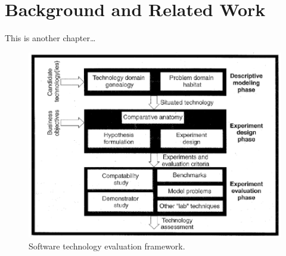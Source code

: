 \chapter{Background and Related Work}
\label{chap:background}
This is another chapter\ldots

\begin{figure}
    \centering
    \includegraphics[scale=0.5]{figs/framework.png}
    \caption{Software technology evaluation framework.}
    \label{fig:framework}
  \end{figure}
